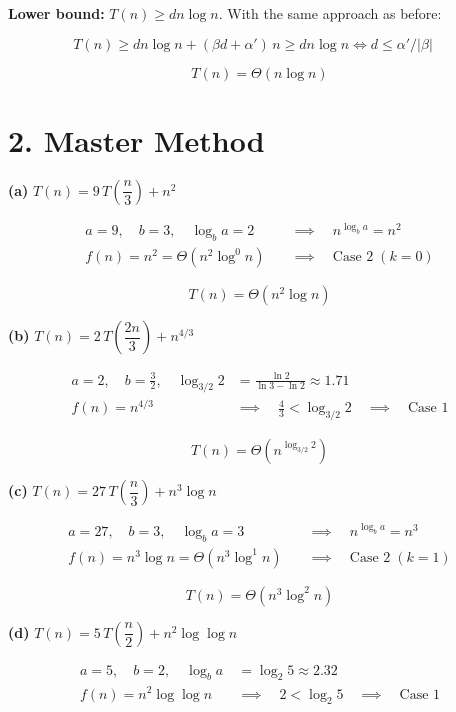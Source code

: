 \documentclass[11pt]{article}
\begin{document}
\textbf{Lower bound:}  $T(n) \ge dn\log n$. With the same approach as before:

\[
T(n) \ge dn\log n + (\beta d + \alpha')\,n \ge dn\log n \iff d \le \alpha'/|\beta| \quad
\]

\[
\boxed{T(n) = \Theta(n\log n)}
\]


\section*{2. Master Method}

\textbf{(a)} $T(n) = 9\,T\!\left(\dfrac{n}{3}\right) + n^2$

\begin{align*}
a = 9,\quad b = 3,\quad \log_b a = 2 \quad&\implies\quad n^{\log_b a} = n^2 \\
f(n) = n^2 = \Theta(n^2 \log^0 n) \quad&\implies\quad \text{Case 2}\;(k=0)
\end{align*}

\[
\boxed{T(n) = \Theta(n^2 \log n)}
\]


\textbf{(b)} $T(n) = 2\,T\!\left(\dfrac{2n}{3}\right) + n^{4/3}$

\begin{align*}
a = 2,\quad b = \tfrac{3}{2},\quad \log_{3/2} 2 &= \frac{\ln 2}{\ln 3 - \ln 2} \approx 1.71 \\
f(n) = n^{4/3} \quad&\implies\quad \tfrac{4}{3} < \log_{3/2}2 \quad\implies\quad \text{Case 1}
\end{align*}

\[
\boxed{T(n) = \Theta\!\left(n^{\log_{3/2}2}\right)}
\]


\textbf{(c)} $T(n) = 27\,T\!\left(\dfrac{n}{3}\right) + n^3\log n$

\begin{align*}
a = 27,\quad b = 3,\quad \log_b a = 3 \quad&\implies\quad n^{\log_b a} = n^3 \\
f(n) = n^3\log n = \Theta(n^3 \log^1 n) \quad&\implies\quad \text{Case 2}\;(k=1)
\end{align*}

\[
\boxed{T(n) = \Theta(n^3 \log^2 n)}
\]


\textbf{(d)} $T(n) = 5\,T\!\left(\dfrac{n}{2}\right) + n^2\log\log n$

\begin{align*}
a = 5,\quad b = 2,\quad \log_b a &= \log_2 5 \approx 2.32 \\
f(n) = n^2\log\log n \quad&\implies\quad 2 < \log_2 5 \quad\implies\quad \text{Case 1}
\end{align*}
\end{document}
